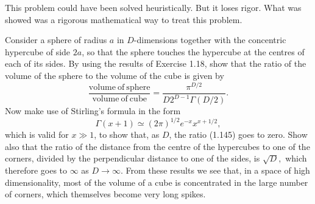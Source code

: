 \begin{rem}
This problem could have been solved heuristically. But it loses rigor.
What was showed was a rigorous mathematical way to treat this problem. 
\end{rem}
\begin{cBoxA}{}
 Consider a sphere of radius $a$ in $D$-dimensions together with
the concentric hypercube of side $2a$, so that the sphere touches
the hypercube at the centres of each of its sides. By using the results
of Exercise 1.18, show that the ratio of the volume of the sphere
to the volume of the cube is given by
\[
\frac{\mathrm{volume\ of\ sphere}}{\mathrm{volume\ of\ cube}}=\frac{\pi^{D/2}}{D2^{D-1}\Gamma(D/2)}.
\]
Now make use of Stirling's formula in the form 
\[
\Gamma(x+1)\simeq(2\pi)^{1/2}e^{-x}x^{x+1/2},
\]
which is valid for $x\gg1$, to show that, as $D$, the ratio (1.145)
goes to zero. Show also that the ratio of the distance from the centre
of the hypercubes to one of the corners, divided by the perpendicular
distance to one of the sides, is $\sqrt{D},$ which therefore goes
to $\infty$ as $D\rightarrow\infty$. From these results we see that,
in a space of high dimensionality, most of the volume of a cube is
concentrated in the large number of corners, which themselves become
very long \textquotedbl spikes\textquotedbl . 
\end{cBoxA}


